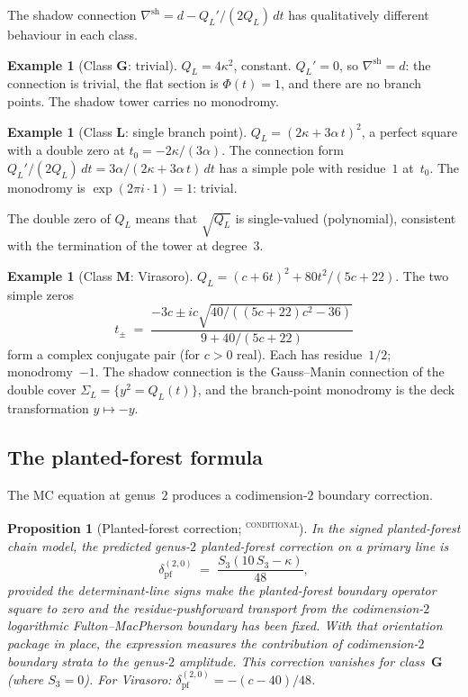 \documentclass[11pt,reqno]{amsart}
\newtheorem{proposition}[theorem]{Proposition}
\theoremstyle{definition}
\newtheorem{example}[theorem]{Example}
\theoremstyle{remark}
\providecommand{\ClaimStatusConditional}{\textsuperscript{\textsc{conditional}}}
\numberwithin{equation}{section}
\begin{document}
The shadow connection
$\nabla^{\mathrm{sh}} = d - Q_L'/(2Q_L)\, dt$ has
qualitatively different behaviour in each class.

\begin{example}[Class $\mathbf{G}$:
trivial]\label{ex:conn-G}
$Q_L = 4\kappa^2$, constant. $Q_L' = 0$, so
$\nabla^{\mathrm{sh}} = d$: the connection is trivial, the
flat section is $\Phi(t) = 1$, and there are no branch
points. The shadow tower carries no monodromy.
\end{example}

\begin{example}[Class $\mathbf{L}$: single branch
point]\label{ex:conn-L}
$Q_L = (2\kappa + 3\alpha\, t)^2$, a perfect square with a
double zero at $t_0 = -2\kappa/(3\alpha)$. The connection
form $Q_L'/(2Q_L)\, dt = 3\alpha/(2\kappa + 3\alpha\, t)\, dt$
has a simple pole with residue~$1$ at~$t_0$. The monodromy
is $\exp(2\pi i \cdot 1) = 1$: trivial.

The double zero of $Q_L$ means that $\sqrt{Q_L}$ is
single-valued (polynomial), consistent with the termination
of the tower at degree~$3$.
\end{example}

\begin{example}[Class $\mathbf{M}$:
Virasoro]\label{ex:conn-M}
$Q_L = (c + 6t)^2 + 80t^2/(5c+22)$. The two simple zeros
\[
 t_\pm
 \;=\;
 \frac{-3c \pm ic\sqrt{40/((5c+22)c^2 - 36)}}{
 9 + 40/(5c+22)}
\]
form a complex conjugate pair (for $c > 0$ real). Each has
residue~$1/2$; monodromy~$-1$. The shadow connection is the
Gauss--Manin connection of the double cover
$\Sigma_L = \{y^2 = Q_L(t)\}$, and the branch-point
monodromy is the deck transformation $y \mapsto -y$.
\end{example}


\subsection{The planted-forest
formula}\label{subsec:planted-forest}

The MC equation at genus~$2$ produces a codimension-$2$
boundary correction.

\begin{proposition}[Planted-forest
correction; \ClaimStatusConditional]\label{prop:planted-forest}
In the signed planted-forest chain model, the predicted genus-$2$
planted-forest correction on a primary line is
\begin{equation}\label{eq:planted-forest}
 \delta_{\mathrm{pf}}^{(2,0)}
 \;=\;
 \frac{S_3(10\, S_3 - \kappa)}{48},
\end{equation}
provided the determinant-line signs make the planted-forest boundary
operator square to zero and the residue-pushforward transport from the
codimension-$2$ logarithmic Fulton--MacPherson boundary has been fixed.
With that orientation package in place, the expression measures the
contribution of codimension-$2$ boundary strata to the genus-$2$
amplitude. This correction vanishes for class~$\mathbf{G}$ (where
$S_3 = 0$). For Virasoro:
$\delta_{\mathrm{pf}}^{(2,0)} = -(c - 40)/48$.
\end{proposition}
\end{document}
